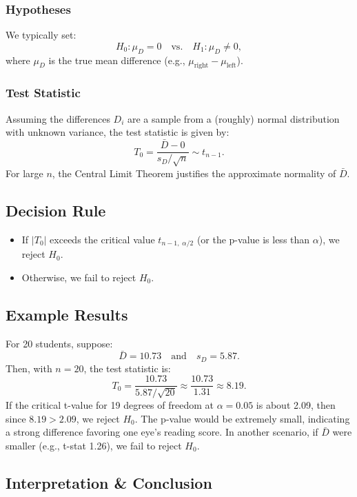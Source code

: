 \documentclass[10pt]{extarticle}
\begin{document}
\subsubsection{Hypotheses}
We typically set:
$$H_0: \mu_D = 0 \quad \text{vs.} \quad H_1: \mu_D \neq 0,$$
where $\mu_D$ is the true mean difference (e.g., $\mu_{\text{right}} - \mu_{\text{left}}$).

\subsubsection{Test Statistic}
Assuming the differences $D_i$ are a sample from a (roughly) normal distribution with unknown variance, the test statistic is given by:
$$T_0 = \frac{\bar{D} - 0}{s_D / \sqrt{n}} \sim t_{n-1}.$$
For large $n$, the Central Limit Theorem justifies the approximate normality of $\bar{D}$.

\subsection{Decision Rule}
\begin{itemize}
    \item If $|T_0|$ exceeds the critical value $t_{n-1,\;\alpha/2}$ (or the p-value is less than $\alpha$), we reject $H_0$.
    \item Otherwise, we fail to reject $H_0$.
\end{itemize}

\subsection{Example Results}
\begin{examplebox}{}{}
    For 20 students, suppose:
    $$\bar{D} = 10.73 \quad \text{and} \quad s_D = 5.87.$$
    Then, with $n = 20$, the test statistic is:
    $$T_0 = \frac{10.73}{5.87/\sqrt{20}} \approx \frac{10.73}{1.31} \approx 8.19.$$
    If the critical t-value for 19 degrees of freedom at $\alpha = 0.05$ is about 2.09, then since $8.19 > 2.09$, we reject $H_0$. The p-value would be extremely small, indicating a strong difference favoring one eye's reading score. In another scenario, if $\bar{D}$ were smaller (e.g., t-stat 1.26), we fail to reject $H_0$.
\end{examplebox}

\subsection{Interpretation \& Conclusion}
\end{document}
